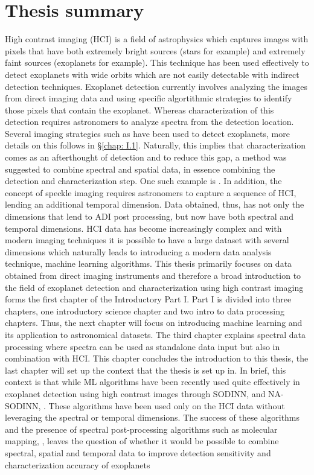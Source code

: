 \chapter*{Thesis summary}
High contrast imaging (HCI) is a field of astrophysics which captures images with pixels that have both extremely bright sources (stars for example) and extremely faint sources (exoplanets for example).
This technique has been used effectively to detect exoplanets with wide orbits which are not easily detectable with indirect detection techniques.
Exoplanet detection currently involves analyzing the images from direct imaging data and using specific algortithmic strategies to identify those pixels that contain the exoplanet.
Whereas characterization of this detection requires astronomers to analyze spectra from the detection location.
Several imaging strategies such as \citep[ADI, ][]{2006MaroisADI} have been used to detect exoplanets, more details on this follows in 
\S\ref{chap: I.1}.
Naturally, this implies that characterization comes as an afterthought of detection and to reduce this gap, a method was suggested to combine spectral and spatial data, in essence combining the detection 
and characterization step.
One such example is \citet[][]{2002SparksSDI}.
In addition, the concept of speckle imaging requires astronomers to capture a sequence of HCI, lending an additional temporal dimension.
Data obtained, thus, has not only the dimensions that lend to ADI post processing, but now have both spectral and temporal dimensions.
HCI data has become increasingly complex and with modern imaging techniques it is possible to have a large dataset with several dimensions which naturally
leads to introducing a modern data analysis technique, machine learning algorithms.
This thesis primarily focuses on data obtained from direct imaging instruments and therefore a broad introduction to the field of exoplanet detection and characterization using high contrast imaging forms the first chapter of the Introductory Part I.
Part I is divided into three chapters, one introductory science chapter and two intro to data processing chapters.
Thus, the next chapter will focus on introducing machine learning and its application to astronomical datasets.
The third chapter explains spectral data processing where spectra can be used as standalone data input but also in combination with HCI.
This chapter concludes the introduction to this thesis, the last chapter will set up the context that the thesis is set up in.
In brief, this context is that while ML algorithms have been recently used quite effectively in exoplanet detection using high contrast images through SODINN, \citet[][]{2018Gomez}
and NA-SODINN, \citet[][]{2023Carlito}.
These algorithms have been used only on the HCI data without leveraging the spectral or temporal dimensions. 
The success of these algorithms and the presence of spectral post-processing algorithms such as molecular mapping, \citet[][]{2018AHoeijmakersMM},
leaves the question of whether it would be possible to combine spectral, spatial and temporal data to improve detection sensitivity and characterization accuracy of exoplanets %

